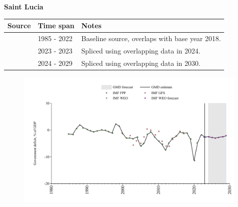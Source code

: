 \documentclass[12pt,a4paper,landscape]{article}
\begin{document}
\begin{adjustbox}{max totalsize={\paperwidth}{\paperheight},center}
\begin{minipage}[t][\textheight][t]{\textwidth}
\vspace*{0.5cm}
{}
\begin{center}
{\Large\bfseries Saint Lucia}
\end{center}
\vspace{0.5cm}
\begin{table}[H]
\centering
\small
\begin{tabular}{|l|l|l|}
\hline
\textbf{Source} & \textbf{Time span} & \textbf{Notes} \\
\hline
\rowcolor{white}\cite{IMF_WEO}& 1985 - 2022 &Baseline source, overlaps with base year 2018.\\
\rowcolor{lightgray}\cite{IMF_FPP}& 2023 - 2023 &Spliced using overlapping data in 2024.\\
\rowcolor{white}\cite{IMF_WEO_forecast}& 2024 - 2029 &Spliced using overlapping data in 2030.\\
\hline
\end{tabular}
\end{table}
\begin{figure}[H]
\centering
\includegraphics[width=\textwidth,height=0.6\textheight,keepaspectratio]{graphs/LCA_govdef_GDP.pdf}
\end{figure}
\end{minipage}
\end{adjustbox}
\end{document}
